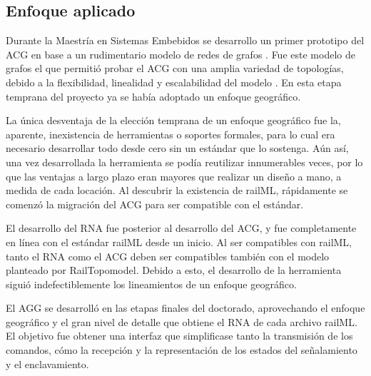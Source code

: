 \subsection{Enfoque aplicado}

    Durante la Maestría en Sistemas Embebidos se desarrollo un primer prototipo del ACG en base a un rudimentario modelo de redes de grafos \cite{Paper_206}. Fue este modelo de grafos el que permitió probar el ACG con una amplia variedad de topologías, debido a la flexibilidad, linealidad y escalabilidad del modelo \cite{Paper_109,Paper_149,Paper_150}. En esta etapa temprana del proyecto ya se había adoptado un enfoque geográfico.

    La única desventaja de la elección temprana de un enfoque geográfico fue la, aparente, inexistencia de herramientas o soportes formales, para lo cual era necesario desarrollar todo desde cero sin un estándar que lo sostenga. Aún así, una vez desarrollada la herramienta se podía reutilizar innumerables veces, por lo que las ventajas a largo plazo eran mayores que realizar un diseño a mano, a medida de cada locación. Al descubrir la existencia de railML, rápidamente se comenzó la migración del ACG para ser compatible con el estándar.

    El desarrollo del RNA fue posterior al desarrollo del ACG, y fue completamente en línea con el estándar railML desde un inicio. Al ser compatibles con railML, tanto el RNA como el ACG deben ser compatibles también con el modelo planteado por RailTopomodel. Debido a esto, el desarrollo de la herramienta siguió indefectiblemente los lineamientos de un enfoque geográfico.
    
    El AGG se desarrolló en las etapas finales del doctorado, aprovechando el enfoque geográfico y el gran nivel de detalle que obtiene el RNA de cada archivo railML. El objetivo fue obtener una interfaz que simplificase tanto la transmisión de los comandos, cómo la recepción y la representación de los estados del señalamiento y el enclavamiento.